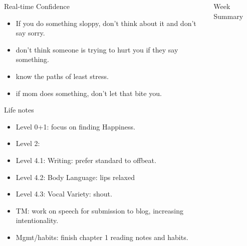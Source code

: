 \documentclass[serif, mathserif, final]{beamer}
\begin{document}
\begin{frame}{}
\begin{columns}
\begin{column}{0.25\linewidth}
      \begin{block}{Real-time Confidence}
        \begin{itemize}
          \tiny \item \tiny If you do something sloppy, don't
          think about it and don't say sorry. 
        \item \tiny don't think someone is trying to hurt you if
          they say something.
        \item \tiny know the paths of least stress. 
        \item \tiny if mom does something, don't let that bite you. 
        \end{itemize}
      \end{block}
      
      \begin{block}{Life notes} 
        \begin{itemize} 
          \tiny \item \tiny Level 0+1: focus on finding Happiness. 
        \item \tiny Level 2: 
        \item \tiny Level 4.1: Writing: prefer standard to offbeat. 
        \item \tiny Level 4.2: Body Language: lips relaxed
        \item \tiny Level 4.3: Vocal Variety: shout. 
        \item \tiny TM: work on speech for submission to blog, increasing intentionality. 
        \item \tiny Mgmt/habits: finish chapter 1 reading notes and habits. 
        \end{itemize}     
      \end{block}
    \end{column} %
    
    \begin{column}{0.50\linewidth}
      \begin{block}{Week Summary} 



\end{block}
\end{column}
\end{columns}
\end{frame}
\end{document}
